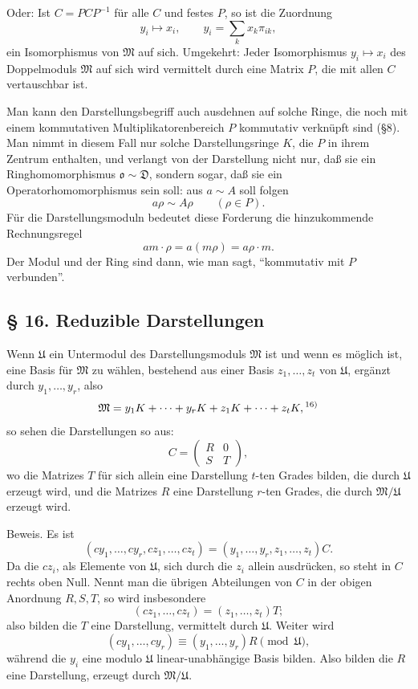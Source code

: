 \documentclass[11pt]{article}
\providecommand{\mM}{\mathfrak{M}}
\providecommand{\mU}{\mathfrak{U}}
\providecommand{\mo}{\mathfrak{o}}
\begin{document}
Oder: Ist $C=PCP^{-1}$ für alle $C$ und festes $P$, so ist die Zuordnung
\[
        y_i\mapsto x_i,
        \qquad y_i=\sum_kx_k\pi_{ik},
\]
ein Isomorphismus von $\mM$ auf sich. Umgekehrt: Jeder Isomorphismus $y_i\mapsto x_i$ des Doppelmoduls $\mM$ auf sich wird vermittelt durch eine Matrix $P$, die mit allen $C$ vertauschbar ist.

Man kann den Darstellungsbegriff auch ausdehnen auf solche Ringe, die noch mit einem kommutativen Multiplikatorenbereich $P$ kommutativ verknüpft sind (§8). Man nimmt in diesem Fall nur solche Darstellungsringe $K$, die $P$ in ihrem Zentrum enthalten, und verlangt von der Darstellung nicht nur, daß sie ein Ringhomomorphismus $\mo\sim\mathfrak D$, sondern sogar, daß sie ein Operatorhomomorphismus sein soll: aus $a\sim A$ soll folgen
\[
        a\rho\sim A\rho\qquad(\rho\in P).
\]
Für die Darstellungsmoduln bedeutet diese Forderung die hinzukommende Rechnungsregel
\[
        am\cdot\rho=a(m\rho)=a\rho\cdot m.
\]
Der Modul und der Ring sind dann, wie man sagt, ``kommutativ mit $P$ verbunden''.

\subsection*{§ 16. Reduzible Darstellungen}
Wenn $\mU$ ein Untermodul des Darstellungsmoduls $\mM$ ist und wenn es möglich ist, eine Basis für $\mM$ zu wählen, bestehend aus einer Basis $z_1,\ldots,z_t$ von $\mU$, ergänzt durch $y_1,\ldots,y_r$, also
\[
        \mM=y_1K+\cdots+y_rK+z_1K+\cdots+z_tK,\textsuperscript{16)}
\]
so sehen die Darstellungen so aus:
\[
        C=\begin{pmatrix}R&0\\ S&T\end{pmatrix},
\]
wo die Matrizes $T$ für sich allein eine Darstellung $t$-ten Grades bilden, die durch $\mU$ erzeugt wird, und die Matrizes $R$ eine Darstellung $r$-ten Grades, die durch $\mM/\mU$ erzeugt wird.

Beweis. Es ist
\[
        (cy_1,\ldots,cy_r,cz_1,\ldots,cz_t)
        =(y_1,\ldots,y_r,z_1,\ldots,z_t)C.
\]
Da die $cz_i$, als Elemente von $\mU$, sich durch die $z_i$ allein ausdrücken, so steht in $C$ rechts oben Null. Nennt man die übrigen Abteilungen von $C$ in der obigen Anordnung $R,S,T$, so wird insbesondere
\[
        (cz_1,\ldots,cz_t)=(z_1,\ldots,z_t)T;
\]
also bilden die $T$ eine Darstellung, vermittelt durch $\mU$. Weiter wird
\[
        (cy_1,\ldots,cy_r)\equiv (y_1,\ldots,y_r)R\pmod{\mU},
\]
während die $y_i$ eine modulo $\mU$ linear-unabhängige Basis bilden. Also bilden die $R$ eine Darstellung, erzeugt durch $\mM/\mU$.
\end{document}
